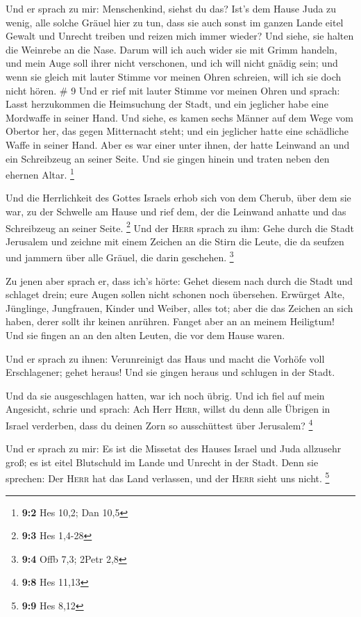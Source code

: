  Und er sprach zu mir: Menschenkind, siehst du das? Ist's
dem Hause Juda zu wenig, alle solche Gräuel hier zu tun, dass sie auch
sonst im ganzen Lande eitel Gewalt und Unrecht treiben und reizen mich
immer wieder? Und siehe, sie halten die Weinrebe an die Nase.
 Darum will ich auch wider sie mit Grimm handeln, und
mein Auge soll ihrer nicht verschonen, und ich will nicht gnädig sein;
und wenn sie gleich mit lauter Stimme vor meinen Ohren schreien, will
ich sie doch nicht hören. \# 9  Und er rief mit lauter
Stimme vor meinen Ohren und sprach: Lasst herzukommen die Heimsuchung
der Stadt, und ein jeglicher habe eine Mordwaffe in seiner Hand.
 Und siehe, es kamen sechs Männer auf dem Wege vom Obertor
her, das gegen Mitternacht steht; und ein jeglicher hatte eine
schädliche Waffe in seiner Hand. Aber es war einer unter ihnen, der
hatte Leinwand an und ein Schreibzeug an seiner Seite. Und sie gingen
hinein und traten neben den ehernen Altar. \footnote{\textbf{9:2} Hes
  10,2; Dan 10,5}

 Und die Herrlichkeit des Gottes Israels erhob sich von
dem Cherub, über dem sie war, zu der Schwelle am Hause und rief dem, der
die Leinwand anhatte und das Schreibzeug an seiner Seite. \footnote{\textbf{9:3}
  Hes 1,4-28}  Und der \textsc{Herr} sprach zu ihm: Gehe
durch die Stadt Jerusalem und zeichne mit einem Zeichen an die Stirn die
Leute, die da seufzen und jammern über alle Gräuel, die darin geschehen.
\footnote{\textbf{9:4} Offb 7,3; 2Petr 2,8}

 Zu jenen aber sprach er, dass ich's hörte: Gehet diesem
nach durch die Stadt und schlaget drein; eure Augen sollen nicht schonen
noch übersehen.  Erwürget Alte, Jünglinge, Jungfrauen,
Kinder und Weiber, alles tot; aber die das Zeichen an sich haben, derer
sollt ihr keinen anrühren. Fanget aber an an meinem Heiligtum! Und sie
fingen an an den alten Leuten, die vor dem Hause waren.

 Und er sprach zu ihnen: Verunreinigt das Haus und macht
die Vorhöfe voll Erschlagener; gehet heraus! Und sie gingen heraus und
schlugen in der Stadt.

 Und da sie ausgeschlagen hatten, war ich noch übrig. Und
ich fiel auf mein Angesicht, schrie und sprach: Ach Herr \textsc{Herr},
willst du denn alle Übrigen in Israel verderben, dass du deinen Zorn so
ausschüttest über Jerusalem? \footnote{\textbf{9:8} Hes 11,13}

 Und er sprach zu mir: Es ist die Missetat des Hauses
Israel und Juda allzusehr groß; es ist eitel Blutschuld im Lande und
Unrecht in der Stadt. Denn sie sprechen: Der \textsc{Herr} hat das Land
verlassen, und der \textsc{Herr} sieht uns nicht. \footnote{\textbf{9:9}
  Hes 8,12}

